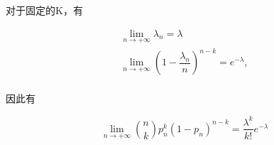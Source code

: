 \documentclass[a4paper, 12pt, draft]{article}
\begin{document}
    对于固定的K，有

    \begin{equation*}
    \begin{aligned}
        \lim_{n \to + \infty} \lambda_n = \lambda \\
        \lim_{n \to + \infty} \left(1 - \dfrac{\lambda_n}{n}\right)^{n-k} = e^{-\lambda}, \\
    \end{aligned}
    \end{equation*}

    因此有

    \begin{equation*}
    \lim_{n \to + \infty} \binom{n}{k} p_n^k (1-p_n)^{n-k} = \dfrac{\lambda^k}{k!} e^{-\lambda}
    \end{equation*}
\end{document}
